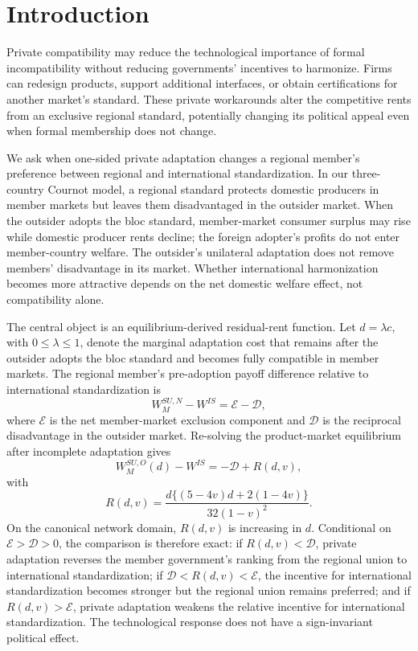 \section{Introduction}
\label{sec:introduction}

Private compatibility may reduce the technological importance of formal incompatibility without reducing governments' incentives to harmonize. Firms can redesign products, support additional interfaces, or obtain certifications for another market's standard. These private workarounds alter the competitive rents from an exclusive regional standard, potentially changing its political appeal even when formal membership does not change.

We ask when one-sided private adaptation changes a regional member's preference between regional and international standardization. In our three-country Cournot model, a regional standard protects domestic producers in member markets but leaves them disadvantaged in the outsider market. When the outsider adopts the bloc standard, member-market consumer surplus may rise while domestic producer rents decline; the foreign adopter's profits do not enter member-country welfare. The outsider's unilateral adaptation does not remove members' disadvantage in its market. Whether international harmonization becomes more attractive depends on the net domestic welfare effect, not compatibility alone.

The central object is an equilibrium-derived residual-rent function. Let $d=\lambda c$, with $0\leq\lambda\leq1$, denote the marginal adaptation cost that remains after the outsider adopts the bloc standard and becomes fully compatible in member markets. The regional member's pre-adoption payoff difference relative to international standardization is
\begin{equation}
    W_M^{SU,N}-W^{IS}=\mathscr E-\mathscr D,
    \label{eq:intro-pre-gap}
\end{equation}
where $\mathscr E$ is the net member-market exclusion component and $\mathscr D$ is the reciprocal disadvantage in the outsider market. Re-solving the product-market equilibrium after incomplete adaptation gives
\begin{equation}
    W_M^{SU,O}(d)-W^{IS}
    =-\mathscr D+R(d,v),
    \label{eq:intro-post-gap}
\end{equation}
with
\begin{equation}
    R(d,v)
    =
    \frac{d\{(5-4v)d+2(1-4v)\}}
         {32(1-v)^2}.
    \label{eq:intro-residual-rent}
\end{equation}
On the canonical network domain, $R(d,v)$ is increasing in $d$. Conditional on $\mathscr E>\mathscr D>0$, the comparison is therefore exact: if $R(d,v)<\mathscr D$, private adaptation reverses the member government's ranking from the regional union to international standardization; if $\mathscr D<R(d,v)<\mathscr E$, the incentive for international standardization becomes stronger but the regional union remains preferred; and if $R(d,v)>\mathscr E$, private adaptation weakens the relative incentive for international standardization. The technological response does not have a sign-invariant political effect.

